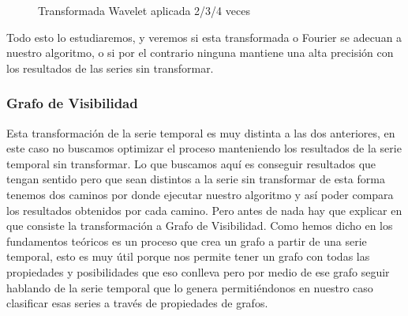 \documentclass[12pt,a4paper]{article}
\begin{document}
\begin{figure}[H]
\begin{subfigure}{.3\textwidth}
  \label{fig:sub2}
\end{subfigure}
\caption{Transformada Wavelet aplicada 2/3/4 veces}
\label{fig:test}
\end{figure}
			Todo esto lo estudiaremos, y veremos si esta transformada o Fourier se adecuan a nuestro algoritmo, o si por el contrario ninguna mantiene una alta precisión con los resultados de las series sin transformar.
			\subsubsection{Grafo de Visibilidad}
			Esta transformación de la serie temporal es muy distinta a las dos anteriores, en este caso no buscamos optimizar el proceso manteniendo los resultados de la serie temporal sin transformar. Lo que buscamos aquí es conseguir resultados que tengan sentido pero que sean distintos a la serie sin transformar de esta forma tenemos dos caminos por donde ejecutar nuestro algoritmo y así poder compara los resultados obtenidos por cada camino.
			Pero antes de nada hay que explicar en que consiste la transformación a Grafo de Visibilidad. Como hemos dicho en los fundamentos teóricos es un proceso que crea un grafo a partir de una serie temporal, esto es muy útil porque nos permite tener un grafo con todas las propiedades y posibilidades que eso conlleva pero por medio de ese grafo seguir hablando de la serie temporal que lo genera permitiéndonos en nuestro caso clasificar esas series a través de propiedades de grafos.\\
\end{document}
